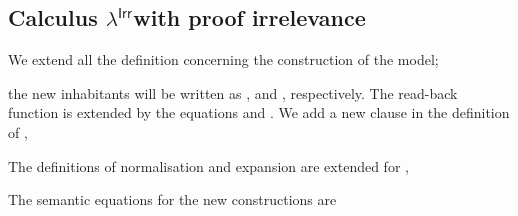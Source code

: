 \documentclass{LMCS}
\newcommand{\lambdaPI}{\texorpdfstring{\ensuremath{\lambda^{\mathsf{Irr}}}}{Proof-irrelevance}}
\newcommand{\LONGVERSION}[1]{}
\newcommand{\SHORTVERSION}[1]{#1}
\newcommand{\PrfIrrTitle}{\subsection{Calculus \lambdaPI with proof irrelevance}}
\begin{document}
\PrfIrrTitle

\label{sec:pi-model}

\LONGVERSION{
We extend all the definitions concerning the construction of the model.

\begin{defi}[Extension of domain ]
  
\end{defi}

}
\SHORTVERSION{
  We extend all the definition concerning the construction of the model;
  
  the new inhabitants will be written as , and ,
  respectively.  The read-back function is extended by the equations
   and
  .  We add a new clause in the definition
  of ,

The definitions of normalisation and expansion are extended for
,
  
  The semantic equations for the new constructions are
  
} 
\end{document}
